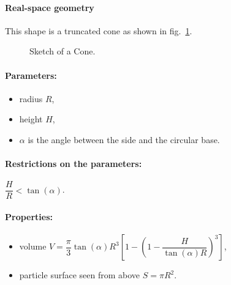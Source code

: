 \paragraph{Real-space geometry}
This shape is a truncated cone as shown in fig.~\ref{fig:cone}. 

\begin{figure}[ht]
\hfill
{}
\hfill
{}
\hfill
\caption{Sketch of a Cone.}
\label{fig:cone}
\end{figure}

\paragraph{Parameters:}
\begin{itemize}
\item radius $R$,
\item height $H$,
\item $\alpha$ is the angle between the side and the circular base.
\end{itemize}

\paragraph{Restrictions on the parameters:} $\dfrac{H}{R}< \tan(\alpha)$.

\paragraph{Properties:}
\begin{itemize}
\item volume $V = \dfrac{\pi}{3} \tan(\alpha) R^3 \left[ 
            1 - \left(1- \dfrac{H}{\tan(\alpha)R}\right)^3\right]$,
\item  particle surface seen from above $S=\pi R^2$.
\end{itemize}

